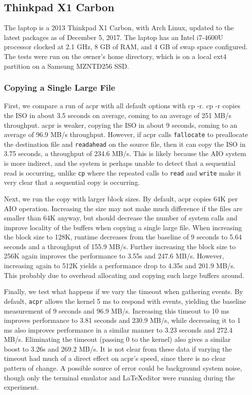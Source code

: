 \documentclass[11pt]{article}
\begin{document}
\subsection{Thinkpad X1 Carbon}
The laptop is a 2013 Thinkpad X1 Carbon, with Arch Linux, updated to the latest packages as of December 5, 2017. The laptop has an Intel i7-4600U processor clocked at 2.1 GHz, 8 GB of RAM, and 4 GB of swap space configured. The tests were run on the owner's home directory, which is on a local ext4 partition on a Samsung MZNTD256 SSD.

\subsubsection{Copying a Single Large File}
First, we compare a run of acpr with all default options with cp -r. cp -r copies the ISO in about 3.5 seconds on average, coming to an average of 251 MB/s throughput. acpr is weaker, copying the ISO in about 9 seconds, coming to an average of 96.9 MB/s throughput. However, if acpr calls \texttt{fallocate} to preallocate the destination file and \texttt{readahead} on the source file, then it can copy the ISO in 3.75 seconds, a throughput of 234.6 MB/s. This is likely because the AIO system is more indirect, and the system is perhaps unable to detect that a sequential read is occurring, unlike \texttt{cp} where the repeated calls to \texttt{read} and \texttt{write} make it very clear that a sequential copy is occurring.

Next, we run the copy with larger block sizes. By default, acpr copies 64K per AIO operation. Increasing the size may not make much difference if the files are smaller than 64K anyway, but should decrease the number of system calls and improve locality of the buffers when copying a single large file. When increasing the block size to 128K, runtime decreases from the baseline of 9 seconds to 5.64 seconds and a throughput of 155.9 MB/s. Further increasing the block size to 256K again improves the performance to 3.55s and 247.6 MB/s. However, increasing again to 512K yields a performance drop to 4.35s and 201.9 MB/s. This probably due to overhead allocating and copying such large buffers around.

Finally, we test what happens if we vary the timeout when gathering events. By default, \texttt{acpr} allows the kernel 5 ms to respond with events, yielding the baseline measurement of 9 seconds and 96.9 MB/s. Increasing this timeout to 10 ms improves performance to 3.81 seconds and 230.9 MB/s, while decreasing it to 1 ms also improves performance in a similar manner to 3.23 seconds and 272.4 MB/s. Eliminating the timeout (passing 0 to the kernel) also gives a similar boost to 3.26s and 269.2 MB/s. It is not clear from these data if varying the timeout had much of a direct effect on acpr's speed, since there is no clear pattern of change. A possible source of error could be background system noise, though only the terminal emulator and \LaTeX editor were running during the experiment.
\end{document}
